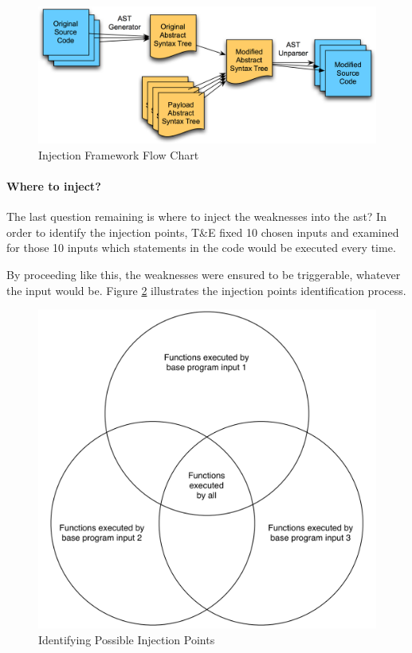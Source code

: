 \begin{figure}[ht]
    \centering
    \includegraphics[scale=0.43]{figures/injection-process}
    \caption{Injection Framework Flow Chart \cite{iarpa2014stonesoup}}
    \label{fig:injection-process}
\end{figure}

\clearpage

\paragraph{Where to inject?}

The last question remaining is where to inject the weaknesses into the \gls{ast}? In order to identify the injection points, T\&E fixed 10 chosen inputs and examined for those 10 inputs which statements in the code would be executed every time.

By proceeding like this, the weaknesses were ensured to be triggerable, whatever the input would be. Figure \ref{fig:injection-points} illustrates the injection points identification process.

\vspace{1.5cm}

\begin{figure}[ht]
    \centering
    \includegraphics[scale=0.45]{figures/injection-points}
    \caption{Identifying Possible Injection Points \cite{iarpa2014stonesoup}}
    \label{fig:injection-points}
\end{figure}

